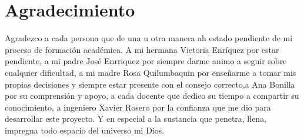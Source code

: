 \renewcommand{\thepage}{\roman{page}}
\section*{Agradecimiento}
Agradezco a cada persona que de una u otra manera ah estado pendiente de mi proceso de formación académica. A mi hermana Victoria Enríquez por estar pendiente, a mi padre José Enrriquez por siempre darme animo a seguir sobre cualquier dificultad, a mi madre Rosa Quilumbaquin por enseñarme a tomar mis propias decisiones y siempre estar presente con el consejo correcto,a Ana Bonilla por su comprensión y apoyo, a cada docente que dedico su tiempo a compartir su conocimiento, a ingeniero Xavier Rosero por la confianza que me dio para desarrollar este proyecto. Y  en especial a la sustancia que penetra, llena, impregna todo espacio del universo mi Dios.
\thispagestyle{empty}


